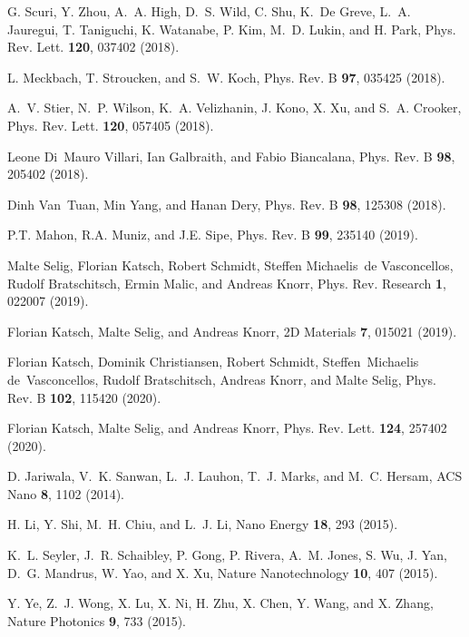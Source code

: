 \documentclass[aps,prb,superscriptaddress,letterpaper,amsmath,amssymb,twocolumn,preprintnumbers]{revtex4}
\begin{document}
\begin{thebibliography}{10}
G. Scuri, Y. Zhou, A.~A. High, D.~S. Wild, C. Shu, K.~De Greve, L.~A. Jauregui,
  T. Taniguchi, K. Watanabe, P. Kim, M.~D. Lukin, and H. Park, Phys. Rev. Lett.
  {\bf 120},  037402   (2018).

L. Meckbach, T. Stroucken, and S.~W. Koch, Phys. Rev. B {\bf 97},  035425
  (2018).

A.~V. Stier, N.~P. Wilson, K.~A. Velizhanin, J. Kono, X. Xu, and S.~A. Crooker,
  Phys. Rev. Lett. {\bf 120},  057405   (2018).

Leone Di~Mauro Villari, Ian Galbraith, and Fabio Biancalana, Phys. Rev. B {\bf
  98},  205402  (2018).

Dinh Van~Tuan, Min Yang, and Hanan Dery, Phys. Rev. B {\bf 98},  125308
  (2018).

P.T. Mahon, R.A. Muniz, and J.E. Sipe, Phys. Rev. B {\bf 99},  235140  (2019).

Malte Selig, Florian Katsch, Robert Schmidt, Steffen Michaelis~de Vasconcellos,
  Rudolf Bratschitsch, Ermin Malic, and Andreas Knorr, Phys. Rev. Research {\bf
  1},  022007  (2019).

Florian Katsch, Malte Selig, and Andreas Knorr, 2D Materials {\bf 7},  015021
  (2019).

Florian Katsch, Dominik Christiansen, Robert Schmidt, Steffen~Michaelis
  de~Vasconcellos, Rudolf Bratschitsch, Andreas Knorr, and Malte Selig, Phys.
  Rev. B {\bf 102},  115420  (2020).

Florian Katsch, Malte Selig, and Andreas Knorr, Phys. Rev. Lett. {\bf 124},
  257402  (2020).

D. Jariwala, V.~K. Sanwan, L.~J. Lauhon, T.~J. Marks, and M.~C. Hersam, ACS
  Nano {\bf 8},  1102  (2014).

H. Li, Y. Shi, M.~H. Chiu, and L.~J. Li, Nano Energy {\bf 18},  293  (2015).

K.~L. Seyler, J.~R. Schaibley, P. Gong, P. Rivera, A.~M. Jones, S. Wu, J. Yan,
  D.~G. Mandrus, W. Yao, and X. Xu, Nature Nanotechnology {\bf 10},  407
  (2015).

Y. Ye, Z.~J. Wong, X. Lu, X. Ni, H. Zhu, X. Chen, Y. Wang, and X. Zhang, Nature
  Photonics {\bf 9},  733  (2015).


\end{thebibliography}
\end{document}

